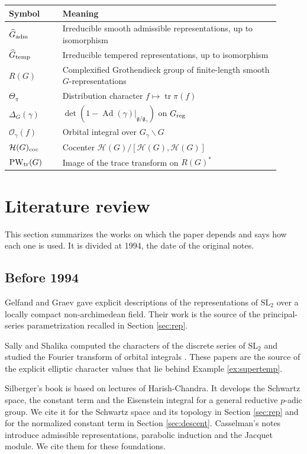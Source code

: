 \documentclass[12pt,letterpaper]{amsart}
\numberwithin{equation}{section}
\theoremstyle{definition}
\theoremstyle{remark}
\newcommand{\calH}{\mathcal H}
\newcommand{\tr}{\operatorname{tr}}
\newcommand{\Ad}{\operatorname{Ad}}
\newcommand{\PW}{\operatorname{PW}}
\begin{document}
\begin{center}\small
\begin{tabular}{@{}p{0.18\linewidth}p{0.73\linewidth}@{}}\toprule
Symbol & Meaning \\\midrule
$\widehat G_{\rm adm}$ & Irreducible smooth admissible representations, up to isomorphism \\
$\widehat G_{\rm temp}$ & Irreducible tempered representations, up to isomorphism \\
$R(G)$ & Complexified Grothendieck group of finite-length smooth $G$-representations \\
$\Theta_\pi$ & Distribution character $f\mapsto\tr\pi(f)$ \\
$\Delta_G(\gamma)$ & $\det(1-\Ad(\gamma)|_{\mathfrak g/\mathfrak g_\gamma})$ on $G_{\rm reg}$ \\
$\mathcal O_\gamma(f)$ & Orbital integral over $G_\gamma\backslash G$ \\
$\calH(G)_{\rm coc}$ & Cocenter $\calH(G)/[\calH(G),\calH(G)]$ \\
$\PW_{\rm tr}(G)$ & Image of the trace transform on $R(G)^*$ \\\bottomrule
\end{tabular}
\end{center}

\section*{Literature review}\label{sec:lit}
This section summarizes the works on which the paper depends and says how each one is used. It is divided at 1994, the date of the original notes.

\subsection*{Before 1994}
Gelfand and Graev \cite{GG63} gave explicit descriptions of the representations of $\mathrm{SL}_2$ over a locally compact non-archimedean field. Their work is the source of the principal-series parametrization recalled in Section \ref{sec:rep}.

Sally and Shalika computed the characters of the discrete series of $\mathrm{SL}_2$ \cite{SS68} and studied the Fourier transform of orbital integrals \cite{SS84}. These papers are the source of the explicit elliptic character values that lie behind Example \ref{ex:supertemp}.

Silberger's book \cite{Si79} is based on lectures of Harish-Chandra. It develops the Schwartz space, the constant term and the Eisenstein integral for a general reductive $p$-adic group. We cite it for the Schwartz space and its topology in Section \ref{sec:rep} and for the normalized constant term in Section \ref{sec:descent}. Casselman's notes \cite{Ca93} introduce admissible representations, parabolic induction and the Jacquet module. We cite them for these foundations.
\end{document}
